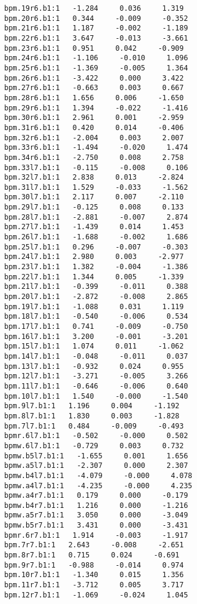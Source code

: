 \begin{verbatim}
bpm.19r6.b1:1   -1.284     0.036     1.319
bpm.20r6.b1:1   0.344     -0.009     -0.352
bpm.21r6.b1:1   1.187     -0.002     -1.189
bpm.22r6.b1:1   3.647     -0.013     -3.661
bpm.23r6.b1:1   0.951     0.042     -0.909
bpm.24r6.b1:1   -1.106     -0.010     1.096
bpm.25r6.b1:1   -1.369     -0.005     1.364
bpm.26r6.b1:1   -3.422     0.000     3.422
bpm.27r6.b1:1   -0.663     0.003     0.667
bpm.28r6.b1:1   1.656     0.006     -1.650
bpm.29r6.b1:1   1.394     -0.022     -1.416
bpm.30r6.b1:1   2.961     0.001     -2.959
bpm.31r6.b1:1   0.420     0.014     -0.406
bpm.32r6.b1:1   -2.004     0.003     2.007
bpm.33r6.b1:1   -1.494     -0.020     1.474
bpm.34r6.b1:1   -2.750     0.008     2.758
bpm.33l7.b1:1   -0.115     -0.008     0.106
bpm.32l7.b1:1   2.838     0.013     -2.824
bpm.31l7.b1:1   1.529     -0.033     -1.562
bpm.30l7.b1:1   2.117     0.007     -2.110
bpm.29l7.b1:1   -0.125     0.008     0.133
bpm.28l7.b1:1   -2.881     -0.007     2.874
bpm.27l7.b1:1   -1.439     0.014     1.453
bpm.26l7.b1:1   -1.688     -0.002     1.686
bpm.25l7.b1:1   0.296     -0.007     -0.303
bpm.24l7.b1:1   2.980     0.003     -2.977
bpm.23l7.b1:1   1.382     -0.004     -1.386
bpm.22l7.b1:1   1.344     0.005     -1.339
bpm.21l7.b1:1   -0.399     -0.011     0.388
bpm.20l7.b1:1   -2.872     -0.008     2.865
bpm.19l7.b1:1   -1.088     0.031     1.119
bpm.18l7.b1:1   -0.540     -0.006     0.534
bpm.17l7.b1:1   0.741     -0.009     -0.750
bpm.16l7.b1:1   3.200     -0.001     -3.201
bpm.15l7.b1:1   1.074     0.011     -1.062
bpm.14l7.b1:1   -0.048     -0.011     0.037
bpm.13l7.b1:1   -0.932     0.024     0.955
bpm.12l7.b1:1   -3.271     -0.005     3.266
bpm.11l7.b1:1   -0.646     -0.006     0.640
bpm.10l7.b1:1   1.540     -0.000     -1.540
bpm.9l7.b1:1   1.196     0.004     -1.192
bpm.8l7.b1:1   1.830     0.003     -1.828
bpm.7l7.b1:1   0.484     -0.009     -0.493
bpmr.6l7.b1:1   -0.502     -0.000     0.502
bpmw.6l7.b1:1   -0.729     0.003     0.732
bpmw.b5l7.b1:1   -1.655     0.001     1.656
bpmw.a5l7.b1:1   -2.307     0.000     2.307
bpmw.b4l7.b1:1   -4.079     -0.000     4.078
bpmw.a4l7.b1:1   -4.235     -0.000     4.235
bpmw.a4r7.b1:1   0.179     0.000     -0.179
bpmw.b4r7.b1:1   1.216     0.000     -1.216
bpmw.a5r7.b1:1   3.050     0.000     -3.049
bpmw.b5r7.b1:1   3.431     0.000     -3.431
bpmr.6r7.b1:1   1.914     -0.003     -1.917
bpm.7r7.b1:1   2.643     -0.008     -2.651
bpm.8r7.b1:1   0.715     0.024     -0.691
bpm.9r7.b1:1   -0.988     -0.014     0.974
bpm.10r7.b1:1   -1.340     0.015     1.356
bpm.11r7.b1:1   -3.712     0.005     3.717
bpm.12r7.b1:1   -1.069     -0.024     1.045

\end{verbatim}
